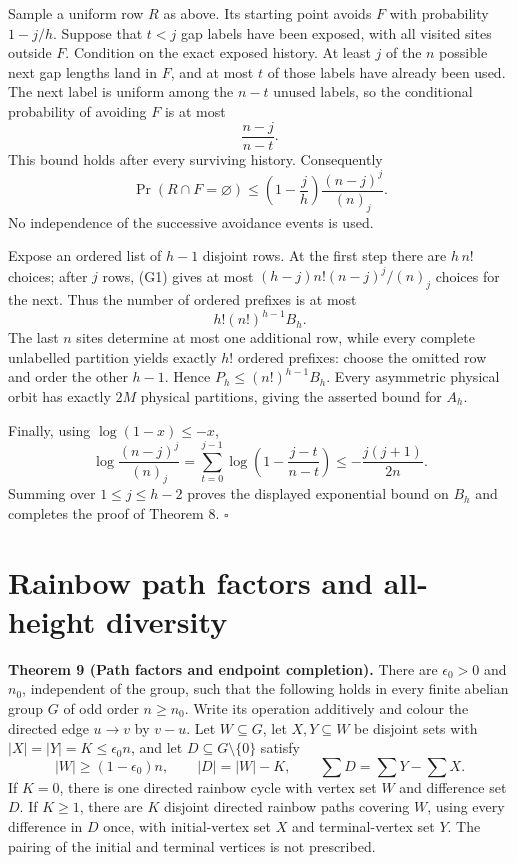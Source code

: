 \documentclass[11pt,a4paper]{article}
\newcommand{\statementstart}{\par\addvspace{6pt plus 1pt minus 1pt}\noindent}
\begin{document}
Sample a uniform row \(R\) as above. Its starting point avoids \(F\) with probability \(1-j/h\). Suppose that \(t<j\) gap labels have been exposed, with all visited sites outside \(F\). Condition on the exact exposed history. At least \(j\) of the \(n\) possible next gap lengths land in \(F\), and at most \(t\) of those labels have already been used. The next label is uniform among the \(n-t\) unused labels, so the conditional probability of avoiding \(F\) is at most \[
 \frac{n-j}{n-t}.
\] This bound holds after every surviving history. Consequently \begin{equation}
\Pr(R\cap F=\varnothing)
 \leq\left(1-\frac jh\right)
       \frac{(n-j)^j}{(n)_j}.
\tag{G1}\label{eq:G1}
\end{equation} No independence of the successive avoidance events is used.

Expose an ordered list of \(h-1\) disjoint rows. At the first step there are \(h\,n!\) choices; after \(j\) rows, (G1) gives at most \((h-j)n! (n-j)^j/(n)_j\) choices for the next. Thus the number of ordered prefixes is at most \[
 h!(n!)^{h-1}B_h.
\] The last \(n\) sites determine at most one additional row, while every complete unlabelled partition yields exactly \(h!\) ordered prefixes: choose the omitted row and order the other \(h-1\). Hence \(P_h\leq(n!)^{h-1}B_h\). Every asymmetric physical orbit has exactly \(2M\) physical partitions, giving the asserted bound for \(A_h\).

Finally, using \(\log(1-x)\leq-x\), \[
 \log\frac{(n-j)^j}{(n)_j}
 =\sum_{t=0}^{j-1}\log\!\left(1-\frac{j-t}{n-t}\right)
 \leq-\frac{j(j+1)}{2n}.
\] Summing over \(1\leq j\leq h-2\) proves the displayed exponential bound on \(B_h\) and completes the proof of Theorem 8. \(\square\)

\hypertarget{rainbow-path-factors-and-all-height-diversity}{%
\section{Rainbow path factors and all-height diversity}\label{rainbow-path-factors-and-all-height-diversity}}

\statementstart\textbf{Theorem 9 (Path factors and endpoint completion).} There are \(\epsilon_0>0\) and \(n_0\), independent of the group, such that the following holds in every finite abelian group \(G\) of odd order \(n\geq n_0\). Write its operation additively and colour the directed edge \(u\to v\) by \(v-u\). Let \(W\subseteq G\), let \(X,Y\subseteq W\) be disjoint sets with \(|X|=|Y|=K\leq\epsilon_0 n\), and let \(D\subseteq G\setminus\{0\}\) satisfy \[
 |W|\geq(1-\epsilon_0)n,\qquad |D|=|W|-K,\qquad
 \sum D=\sum Y-\sum X.
\] If \(K=0\), there is one directed rainbow cycle with vertex set \(W\) and difference set \(D\). If \(K\geq1\), there are \(K\) disjoint directed rainbow paths covering \(W\), using every difference in \(D\) once, with initial-vertex set \(X\) and terminal-vertex set \(Y\). The pairing of the initial and terminal vertices is not prescribed.
\end{document}
